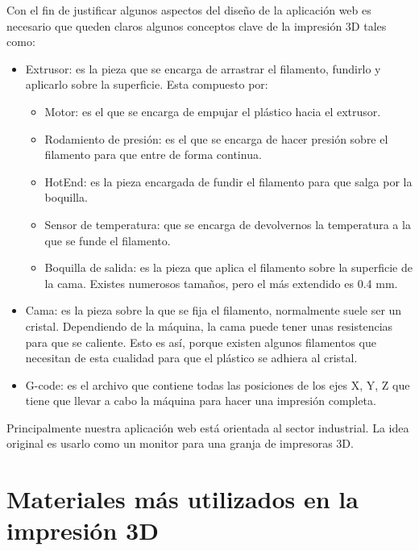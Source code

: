 Con el fin de justificar algunos aspectos del diseño de la aplicación web es necesario que queden claros algunos conceptos clave de la impresión 3D tales como:
\begin{itemize}
\item Extrusor: es la pieza que se encarga de arrastrar el filamento, fundirlo y aplicarlo sobre la superficie. Esta compuesto por:
	\begin{itemize}
		\item Motor: es el que se encarga de empujar el plástico hacia el extrusor.
		\item Rodamiento de presión: es el que se encarga de hacer presión sobre el filamento para que entre de forma continua.
		\item HotEnd: es la pieza encargada de fundir el filamento para que salga por la boquilla.
		\item Sensor de temperatura: que se encarga de devolvernos la temperatura a la que se funde el filamento.
		\item Boquilla de salida: es la pieza que aplica el filamento sobre la superficie de la cama. Existes numerosos tamaños, pero el más extendido es 0.4 mm.
	\end{itemize}

\item Cama: es la pieza sobre la que se fija el filamento, normalmente suele ser un cristal. Dependiendo de la máquina, la cama puede tener unas resistencias para que se caliente. Esto es así, porque existen algunos filamentos que necesitan de esta cualidad para que el plástico se adhiera al cristal.

\item G-code: es el archivo que contiene todas las posiciones de los ejes X, Y, Z que tiene que llevar a cabo la máquina para hacer una impresión completa.

\end{itemize}

Principalmente nuestra aplicación web está orientada al sector industrial. La idea original es usarlo como un monitor para una granja de impresoras 3D.

\section{Materiales más utilizados en la impresión 3D}

